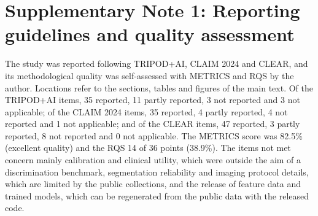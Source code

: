 \section*{Supplementary Note 1: Reporting guidelines and quality assessment}
The study was reported following TRIPOD+AI, CLAIM 2024 and CLEAR, and its methodological quality was self-assessed with METRICS and RQS by the author. Locations refer to the sections, tables and figures of the main text. Of the TRIPOD+AI items, 35 reported, 11 partly reported, 3 not reported and 3 not applicable; of the CLAIM 2024 items, 35 reported, 4 partly reported, 4 not reported and 1 not applicable; and of the CLEAR items, 47 reported, 3 partly reported, 8 not reported and 0 not applicable. The METRICS score was 82.5\% (excellent quality) and the RQS 14 of 36 points (38.9\%). The items not met concern mainly calibration and clinical utility, which were outside the aim of a discrimination benchmark, segmentation reliability and imaging protocol details, which are limited by the public collections, and the release of feature data and trained models, which can be regenerated from the public data with the released code.


